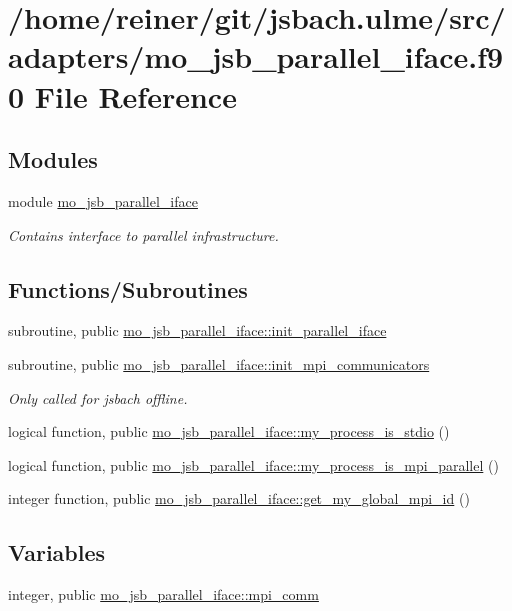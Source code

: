 \hypertarget{mo__jsb__parallel__iface_8f90}{}\section{/home/reiner/git/jsbach.ulme/src/adapters/mo\+\_\+jsb\+\_\+parallel\+\_\+iface.f90 File Reference}
\label{mo__jsb__parallel__iface_8f90}
\subsection*{Modules}
\begin{DoxyCompactItemize}
\item 
module \hyperlink{namespacemo__jsb__parallel__iface}{mo\+\_\+jsb\+\_\+parallel\+\_\+iface}
\begin{DoxyCompactList}\small\item\em Contains interface to parallel infrastructure. \end{DoxyCompactList}\end{DoxyCompactItemize}
\subsection*{Functions/\+Subroutines}
\begin{DoxyCompactItemize}
\item 
subroutine, public \hyperlink{namespacemo__jsb__parallel__iface_a2701efacd4758b8d69ba2edfa9cf157d}{mo\+\_\+jsb\+\_\+parallel\+\_\+iface\+::init\+\_\+parallel\+\_\+iface}
\item 
subroutine, public \hyperlink{namespacemo__jsb__parallel__iface_a32513d5e93412ac7366922368068e91e}{mo\+\_\+jsb\+\_\+parallel\+\_\+iface\+::init\+\_\+mpi\+\_\+communicators}
\begin{DoxyCompactList}\small\item\em Only called for jsbach offline. \end{DoxyCompactList}\item 
logical function, public \hyperlink{namespacemo__jsb__parallel__iface_a9eaf6712087d55f627849cf84c1c1433}{mo\+\_\+jsb\+\_\+parallel\+\_\+iface\+::my\+\_\+process\+\_\+is\+\_\+stdio} ()
\item 
logical function, public \hyperlink{namespacemo__jsb__parallel__iface_a14985502c46b4ad49e9bfe01dcb740c5}{mo\+\_\+jsb\+\_\+parallel\+\_\+iface\+::my\+\_\+process\+\_\+is\+\_\+mpi\+\_\+parallel} ()
\item 
integer function, public \hyperlink{namespacemo__jsb__parallel__iface_ac6bfd4dbf065e7de054fd412aae074ea}{mo\+\_\+jsb\+\_\+parallel\+\_\+iface\+::get\+\_\+my\+\_\+global\+\_\+mpi\+\_\+id} ()
\end{DoxyCompactItemize}
\subsection*{Variables}
\begin{DoxyCompactItemize}
\item 
integer, public \hyperlink{namespacemo__jsb__parallel__iface_a729d21d774b457e2212ba84a1c03a59e}{mo\+\_\+jsb\+\_\+parallel\+\_\+iface\+::mpi\+\_\+comm}
\end{DoxyCompactItemize}
